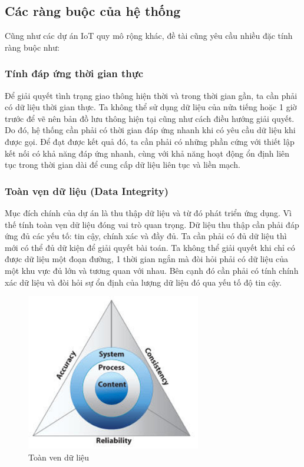 \subsection{Các ràng buộc của hệ thống}
Cũng như các dự án IoT quy mô rộng khác, đề tài cũng yêu cầu nhiều đặc tính ràng buộc như:  
\subsubsection*{Tính đáp ứng thời gian thực}Để giải quyết tình trạng giao thông hiện thời và trong thời gian gần, ta cần phải có dữ liệu thời gian thực. Ta không thể sử dụng dữ liệu của nửa tiếng hoặc 1 giờ trước để vẽ nên bản đồ lưu thông hiện tại cũng như cách điều hướng giải quyết. Do đó, hệ thống cần phải có thời gian đáp ứng nhanh khi có yêu cầu dữ liệu khi được gọi. Để đạt được kết quả đó, ta cần phải có những phần cứng với thiết lập kết nối có khả năng đáp ứng nhanh, cùng với khả năng hoạt động ổn định liên tục trong thời gian dài để cung cấp dữ liệu liên tục và liền mạch.


\subsubsection*{Toàn vẹn dữ liệu (Data Integrity)} Mục đích chính của dự án là thu thập dữ liệu và từ đó phát triển ứng dụng. Vì thế tính toàn vẹn dữ liệu đóng vai trò quan trọng. Dữ liệu thu thập cần phải đáp ứng đủ các yếu tố: tin cậy, chính xác và đầy đủ. Ta cần phải có đủ dữ liệu thì mới có thể đủ dữ kiện để giải quyết bài toán. Ta không thể giải quyết khi chỉ có được dữ liệu một đoạn đường, 1 thời gian ngắn mà đòi hỏi phải có dữ liệu của một khu vực đủ lớn và tương quan với nhau. Bên cạnh đó cần phải có tính chính xác dữ liệu và đòi hỏi sự ổn định của lượng dữ liệu đó qua yếu tố độ tin cậy. 

\begin{figure}[H]
\centering    
\includegraphics[width=3in]{toanvendulieu}
\caption[Toàn ven dữ liệu]{Toàn ven dữ liệu}
\label{fig:toanvendulieu}
\end{figure}

